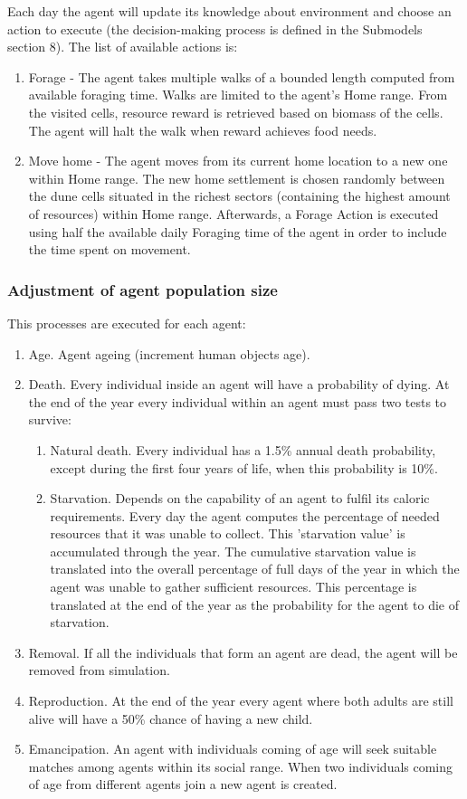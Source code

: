 \documentclass[11pt,oneside,a4paper,openright]{report}
\begin{document}
Each day the agent will update its knowledge about environment and choose an action to execute (the
decision-making process is defined in the Submodels section 8). The list of available actions is:
\begin{enumerate}
\item Forage - The agent takes multiple walks of a bounded length computed from available
foraging time. Walks are limited to the agent’s Home range. From the visited cells, resource
reward is retrieved based on biomass of the cells. The agent will halt the walk when reward
achieves food needs.
\item Move home - The agent moves from its current home location to a new one within Home
range. The new home settlement is chosen randomly between the dune cells situated in the
richest sectors (containing the highest amount of resources) within Home range. Afterwards, a
Forage Action is executed using half the available daily Foraging time of the agent in order to
include the time spent on movement.
\end{enumerate}


\subsubsection{Adjustment of agent population size}
This processes are executed for each agent:

\begin{enumerate}[1-]
	\item Age. Agent ageing (increment human objects age).
	\item Death. Every individual inside an agent will have a probability of dying. At the end of the year
	every individual within an agent must pass two tests to survive:
	\begin{enumerate}
		\item Natural death. Every individual has a 1.5\% annual death probability, except during the
		first four years of life, when this probability is 10\%.
		\item Starvation. Depends on the capability of an agent to fulfil its caloric requirements. Every
		day the agent computes the percentage of needed resources that it was unable to collect.
		This 'starvation value' is accumulated through the year. The cumulative starvation value is
		translated into the overall percentage of full days of the year in which the agent was
		unable to gather sufficient resources. This percentage is translated at the end of the year
		as the probability for the agent to die of starvation.
	\end{enumerate}
	\item Removal. If all the individuals that form an agent are dead, the agent will be removed from
	simulation.
	\item Reproduction. At the end of the year every agent where both adults are still alive will have a
	50\% chance of having a new child.
	\item Emancipation. An agent with individuals coming of age will seek suitable matches among
	agents within its social range. When two individuals coming of age from different agents join a
	new agent is created.
\end{enumerate}
\end{document}
